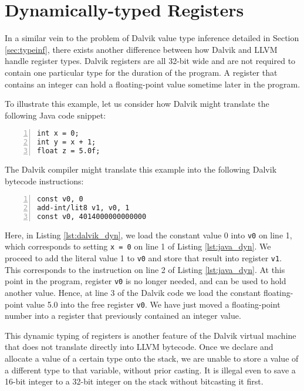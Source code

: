 \section{Dynamically-typed Registers}
\label{sec:dyntype}

In a similar vein to the problem of Dalvik value type inference detailed in Section \ref{sec:typeinf}, there exists another difference between how Dalvik and LLVM handle register types. Dalvik registers are all 32-bit wide and are not required to contain one particular type for the duration of the program. A register that contains an integer can hold a floating-point value sometime later in the program. 

To illustrate this example, let us consider how Dalvik might translate the following Java code snippet:

\lstset{
	language=Java,
	basicstyle=\small,
	stringstyle=\ttfamily
}

\begin{lstlisting}[frame=single, numbers=left, numberstyle=\tiny, caption={Java Dynamic Typing}, label=lst:java_dyn]
int x = 0;
int y = x + 1;
float z = 5.0f;
\end{lstlisting}

The Dalvik compiler might translate this example into the following Dalvik bytecode instructions:


\lstset{
	language=Assembly,
	basicstyle=\small,
	stringstyle=\ttfamily
}

\begin{lstlisting}[frame=single, numbers=left, numberstyle=\tiny, caption={Dalvik bytecode for Listing \ref{lst:java_dyn}}, label=lst:dalvik_dyn]
const v0, 0
add-int/lit8 v1, v0, 1
const v0, 4014000000000000
\end{lstlisting}

Here, in Listing \ref{lst:dalvik_dyn}, we load the constant value 0 into \verb|v0| on line 1, which corresponds to setting \verb|x = 0| on line 1 of Listing \ref{lst:java_dyn}. We proceed to add the literal value 1 to \verb|v0| and store that result into register \verb|v1|. This corresponds to the instruction on line 2 of Listing \ref{lst:java_dyn}. At this point in the program, register \verb|v0| is no longer needed, and can be used to hold another value. Hence, at line 3 of the Dalvik code we load the constant floating-point value 5.0 into the free register \verb|v0|. We have just moved a floating-point number into a register that previously contained an integer value.

This dynamic typing of registers is another feature of the Dalvik virtual machine that does not translate directly into LLVM bytecode. Once we declare and allocate a value of a certain type onto the stack, we are unable to store a value of a different type to that variable, without prior casting. It is illegal even to save a 16-bit integer to a 32-bit integer on the stack without bitcasting it first.

